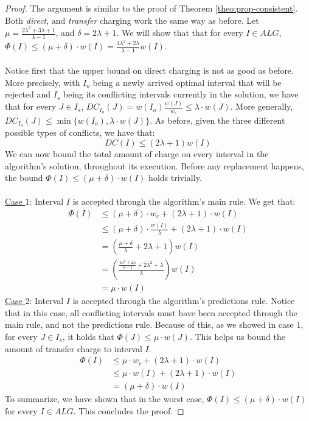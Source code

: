 \begin{proof}
    The argument is similar to the proof of Theorem \ref{theo:prop-consistent}. Both \textit{direct}, and \textit{transfer} charging work the same way as before. Let $\mu = \frac{2\lambda^2 +3\lambda + 1}{\lambda -1 }$, and $\delta = 2\lambda + 1$. We will show that that for every $I \in ALG$, $\Phi(I)\leq (\mu + \delta)\cdot w(I)=\frac{4\lambda^2 + 2\lambda}{\lambda -1}w(I)$.\\\\
    Notice first that the upper bound on direct charging is not as good as before. More precisely, with $I_o$ being a newly arrived optimal interval that will be rejected and $I_s$ being its conflicting intervals currently in the solution, we have that for every $J\in I_s$, $DC_{I_o}(J)= w(I_o)\frac{w(J)}{w_c}\leq \lambda \cdot w(J)$. More generally, $DC_{I_o}(J) \leq \min\{w(I_o),\lambda\cdot w(J)\}$. As before, given the three different possible types of conflicts, we have that:
    \begin{equation}
        DC(I) \leq (2\lambda + 1)w(I)
    \end{equation}
    We can now bound the total amount of charge on every interval in the algorithm's solution, throughout its execution. Before any replacement happens, the bound $\Phi(I) \leq (\mu + \delta)\cdot w(I)$ holds trivially.\\\\
    \underline{Case $1$}: Interval $I$ is accepted through the algorithm's main rule. We get that:
    \[\begin{aligned}
        \Phi(I) &\leq (\mu + \delta)\cdot w_c + (2\lambda + 1)\cdot w(I)\\
        & \leq (\mu + \delta)\cdot \frac{w(I)}{\lambda} + (2\lambda + 1)\cdot w(I)\\
        & = \left(\frac{\mu + \delta}{\lambda} + 2\lambda + 1\right)w(I)\\
        & = \left( \frac{\frac{4\lambda^2 +2\lambda}{\lambda-1}+2\lambda^2 + \lambda}{\lambda} \right)w(I)\\
        & = \mu \cdot w(I)
    \end{aligned}\]
\underline{Case $2$}: Interval $I$ is accepted through the algorithm's predictions rule. Notice that in this case, all conflicting intervals must have been accepted through the main rule, and not the predictions rule. Because of this, as we showed in case $1$, for every $J\in I_s$, it holds that $\Phi(J) \leq \mu\cdot w(J)$. This helps us bound the amount of transfer charge to interval $I$.
\[\begin{aligned}
    \Phi(I) &\leq \mu \cdot w_c + (2\lambda + 1)\cdot w(I)\\
    & \leq \mu \cdot w(I) + (2\lambda + 1)\cdot w(I) \\
    & = (\mu + \delta)\cdot w(I)
\end{aligned}\]
To summarize, we have shown that in the worst case, $\Phi(I) \leq (\mu + \delta)\cdot w(I)$ for every $I\in ALG$. This concludes the proof.
\end{proof}

